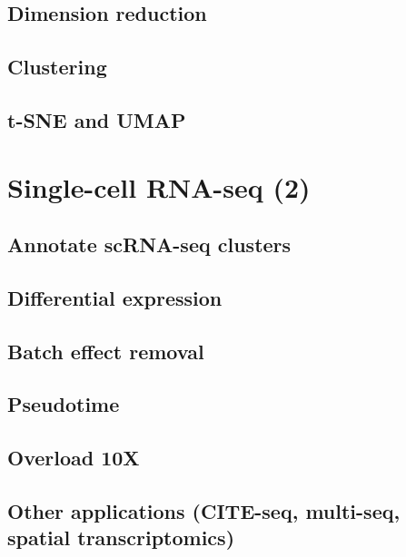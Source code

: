 \documentclass[
]{book}
\begin{document}
\hypertarget{dimension-reduction}{%
\section{Dimension reduction}\label{dimension-reduction}}

\hypertarget{clustering}{%
\section{Clustering}\label{clustering}}

\hypertarget{t-sne-and-umap}{%
\section{t-SNE and UMAP}\label{t-sne-and-umap}}

\hypertarget{scrna2}{%
\chapter{Single-cell RNA-seq (2)}\label{scrna2}}

\hypertarget{annotate-scrna-seq-clusters}{%
\section{Annotate scRNA-seq clusters}\label{annotate-scrna-seq-clusters}}

\hypertarget{differential-expression}{%
\section{Differential expression}\label{differential-expression}}

\hypertarget{batch-effect-removal-1}{%
\section{Batch effect removal}\label{batch-effect-removal-1}}

\hypertarget{pseudotime}{%
\section{Pseudotime}\label{pseudotime}}

\hypertarget{overload-10x}{%
\section{Overload 10X}\label{overload-10x}}

\hypertarget{other-applications-cite-seq-multi-seq-spatial-transcriptomics}{%
\section{Other applications (CITE-seq, multi-seq, spatial transcriptomics)}\label{other-applications-cite-seq-multi-seq-spatial-transcriptomics}}
\end{document}
